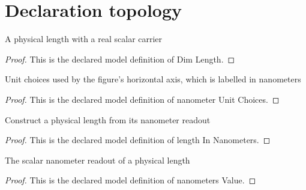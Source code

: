 \section{Declaration topology}
\begin{definition}
  \label{def:physics:phyx-mini-0088:phyxminiproblems-problemphyxmini0088-dimlength}
  A physical length with a real scalar carrier
\end{definition}
\begin{proof}
  This is the declared model definition of Dim Length.
\end{proof}
\begin{definition}
  \label{def:physics:phyx-mini-0088:phyxminiproblems-problemphyxmini0088-nanometerunitchoices}
  Unit choices used by the figure's horizontal axis, which is labelled in nanometers
\end{definition}
\begin{proof}
  This is the declared model definition of nanometer Unit Choices.
\end{proof}
\begin{definition}
  \label{def:physics:phyx-mini-0088:phyxminiproblems-problemphyxmini0088-lengthinnanometers}
  Construct a physical length from its nanometer readout
\end{definition}
\begin{proof}
  This is the declared model definition of length In Nanometers.
\end{proof}
\begin{definition}
  \label{def:physics:phyx-mini-0088:phyxminiproblems-problemphyxmini0088-nanometersvalue}
  The scalar nanometer readout of a physical length
\end{definition}
\begin{proof}
  This is the declared model definition of nanometers Value.
\end{proof}
